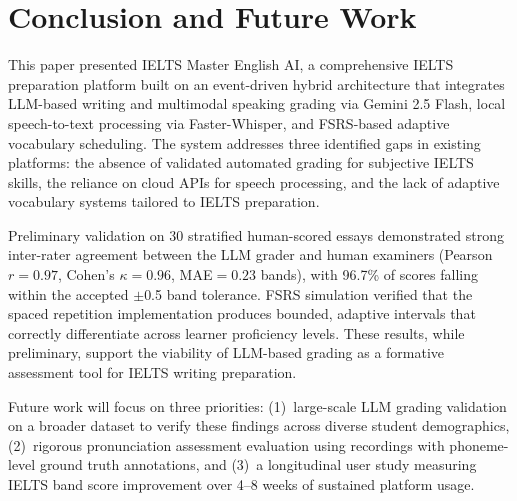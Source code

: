 \documentclass[conference]{IEEEtran}
\begin{document}
\section{Conclusion and Future Work}
\label{sec:conclusion}

This paper presented IELTS Master English AI, a comprehensive IELTS preparation platform built on an event-driven hybrid architecture that integrates LLM-based writing and multimodal speaking grading via Gemini 2.5 Flash, local speech-to-text processing via Faster-Whisper, and FSRS-based adaptive vocabulary scheduling. The system addresses three identified gaps in existing platforms: the absence of validated automated grading for subjective IELTS skills, the reliance on cloud APIs for speech processing, and the lack of adaptive vocabulary systems tailored to IELTS preparation.

Preliminary validation on 30 stratified human-scored essays demonstrated strong inter-rater agreement between the LLM grader and human examiners (Pearson $r=0.97$, Cohen's $\kappa=0.96$, MAE$=0.23$ bands), with 96.7\% of scores falling within the accepted $\pm$0.5 band tolerance. FSRS simulation verified that the spaced repetition implementation produces bounded, adaptive intervals that correctly differentiate across learner proficiency levels. These results, while preliminary, support the viability of LLM-based grading as a formative assessment tool for IELTS writing preparation.

Future work will focus on three priorities: (1)~large-scale LLM grading validation on a broader dataset to verify these findings across diverse student demographics, (2)~rigorous pronunciation assessment evaluation using recordings with phoneme-level ground truth annotations, and (3)~a longitudinal user study measuring IELTS band score improvement over 4--8 weeks of sustained platform usage.

\end{document}
